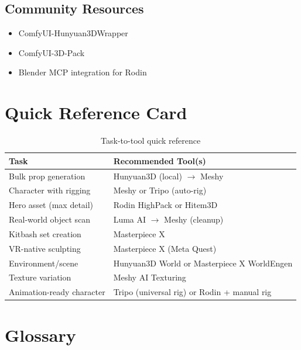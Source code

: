 \documentclass[11pt]{article}
\begin{document}
\subsection*{Community Resources}

\begin{itemize}[leftmargin=2em]
  \item ComfyUI-Hunyuan3DWrapper
  \item ComfyUI-3D-Pack
  \item Blender MCP integration for Rodin
\end{itemize}

\newpage
\appendix
\section{Quick Reference Card}

\begin{table}[H]
\centering
\small
\renewcommand{\arraystretch}{1.4}
\begin{tabularx}{\textwidth}{@{}l X@{}}
\toprule
\textbf{Task} & \textbf{Recommended Tool(s)} \\
\midrule
Bulk prop generation & Hunyuan3D (local) $\rightarrow$ Meshy \\
Character with rigging & Meshy or Tripo (auto-rig) \\
Hero asset (max detail) & Rodin HighPack or Hitem3D \\
Real-world object scan & Luma AI $\rightarrow$ Meshy (cleanup) \\
Kitbash set creation & Masterpiece X \\
VR-native sculpting & Masterpiece X (Meta Quest) \\
Environment/scene & Hunyuan3D World or Masterpiece X WorldEngen \\
Texture variation & Meshy AI Texturing \\
Animation-ready character & Tripo (universal rig) or Rodin + manual rig \\
\bottomrule
\end{tabularx}
\caption{Task-to-tool quick reference}
\label{tab:quickref}
\end{table}

\section{Glossary}
\end{document}
